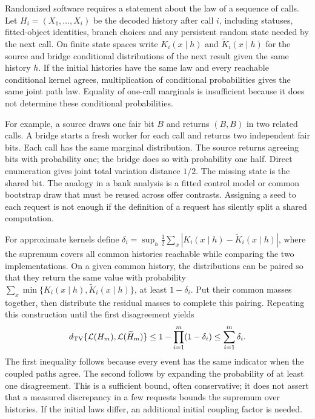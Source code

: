 Randomized software requires a statement about the law of a sequence of calls.
Let $H_i=(X_1,\ldots,X_i)$ be the decoded history after call $i$, including
statuses, fitted-object identities, branch choices and any persistent random
state needed by the next call. On finite state spaces write
$K_i(x\mid h)$ and $\widetilde K_i(x\mid h)$ for the source and bridge
conditional distributions of the next result given the same history $h$.
If the initial histories have the same law and every reachable conditional
kernel agrees, multiplication of conditional probabilities gives the same
joint path law. Equality of one-call marginals is insufficient because it
does not determine these conditional probabilities.

For example, a source draws one fair bit $B$ and returns $(B,B)$ in two
related calls. A bridge starts a fresh worker for each call and returns two
independent fair bits. Each call has the same marginal distribution. The
source returns agreeing bits with probability one; the bridge does so with
probability one half. Direct enumeration gives joint total variation distance
$1/2$. The missing state is the shared bit. The analogy in a bank analysis is
a fitted control model or common bootstrap draw that must be reused across
offer contrasts. Assigning a seed to each request is not enough if the
definition of a request has silently split a shared computation.

For approximate kernels define
$\delta_i=\sup_h \frac12\sum_x|K_i(x\mid h)-\widetilde K_i(x\mid h)|$,
where the supremum covers all common histories reachable while comparing the
two implementations. On a given common history, the distributions can be
paired so that they return the same value with probability
$\sum_x\min\{K_i(x\mid h),\widetilde K_i(x\mid h)\}$, at least
$1-\delta_i$. Put their common masses together, then distribute the residual
masses to complete this pairing. Repeating this construction until the first
disagreement yields
\begin{equation}
 d_{\rm TV}\{\mathcal L(H_m),\mathcal L(\widetilde H_m)\}
 \leq 1-\prod_{i=1}^{m}(1-\delta_i)
 \leq\sum_{i=1}^{m}\delta_i.
 \label{exec17:s9-path-tv}
\end{equation}
The first inequality follows because every event has the same indicator when
the coupled paths agree. The second follows by expanding the probability of
at least one disagreement. This is a sufficient bound, often conservative;
it does not assert that a measured discrepancy in a few requests bounds the
supremum over histories. If the initial laws differ, an additional initial
coupling factor is needed.

